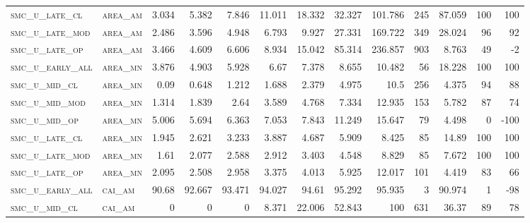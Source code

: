 \begin{landscape}
\begin{center}
\begin{footnotesize}
\begin{longtable}{llrrrrrrrr|rrr}
\textsc{smc\_u\_late\_cl  } & \textsc{area\_am  }   & 3.034    & 5.382    & 7.846    & 11.011   & 18.332   & 32.327   & 101.786   & 245    & 87.059        & 100           & 100             \\
\textsc{smc\_u\_late\_mod } & \textsc{area\_am  }   & 2.486    & 3.596    & 4.948    & 6.793    & 9.927    & 27.331   & 169.722   & 349    & 28.024        & 96            & 92              \\
\textsc{smc\_u\_late\_op  } & \textsc{area\_am  }   & 3.466    & 4.609    & 6.606    & 8.934    & 15.042   & 85.314   & 236.857   & 903    & 8.763         & 49            & -2              \\
\textsc{smc\_u\_early\_all} & \textsc{area\_mn  }   & 3.876    & 4.903    & 5.928    & 6.67     & 7.378    & 8.655    & 10.482    & 56     & 18.228        & 100           & 100             \\
\textsc{smc\_u\_mid\_cl   } & \textsc{area\_mn  }   & 0.09     & 0.648    & 1.212    & 1.688    & 2.379    & 4.975    & 10.5      & 256    & 4.375         & 94            & 88              \\
\textsc{smc\_u\_mid\_mod  } & \textsc{area\_mn  }   & 1.314    & 1.839    & 2.64     & 3.589    & 4.768    & 7.334    & 12.935    & 153    & 5.782         & 87            & 74              \\
\textsc{smc\_u\_mid\_op   } & \textsc{area\_mn  }   & 5.006    & 5.694    & 6.363    & 7.053    & 7.843    & 11.249   & 15.647    & 79     & 4.498         & 0             & -100            \\
\textsc{smc\_u\_late\_cl  } & \textsc{area\_mn  }   & 1.945    & 2.621    & 3.233    & 3.887    & 4.687    & 5.909    & 8.425     & 85     & 14.89         & 100           & 100             \\
\textsc{smc\_u\_late\_mod } & \textsc{area\_mn  }   & 1.61     & 2.077    & 2.588    & 2.912    & 3.403    & 4.548    & 8.829     & 85     & 7.672         & 100           & 100             \\
\textsc{smc\_u\_late\_op  } & \textsc{area\_mn  }   & 2.095    & 2.508    & 2.958    & 3.375    & 4.013    & 5.925    & 12.017    & 101    & 4.419         & 83            & 66              \\
\textsc{smc\_u\_early\_all} & \textsc{cai\_am   }   & 90.68    & 92.667   & 93.471   & 94.027   & 94.61    & 95.292   & 95.935    & 3      & 90.974        & 1             & -98             \\
\textsc{smc\_u\_mid\_cl   } & \textsc{cai\_am   }   & 0        & 0        & 0        & 8.371    & 22.006   & 52.843   & 100       & 631    & 36.37         & 89            & 78              \\

\end{longtable}
\end{footnotesize}
\end{center}
\end{landscape}
